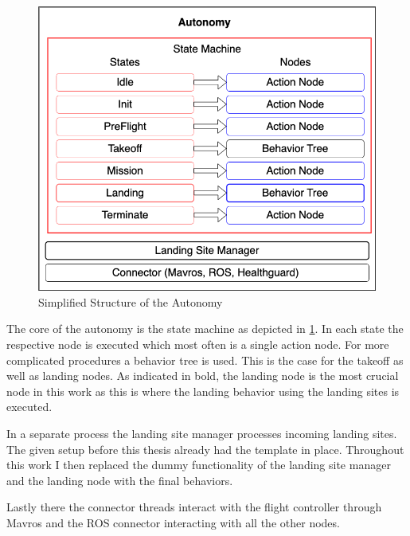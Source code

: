 \begin{figure}[ht!]
    \centering
    \includegraphics[scale=0.45]{images/setup/autonomy.png}
    \caption{Simplified Structure of the Autonomy}
    \label{fig:autonomy}
\end{figure}

The core of the autonomy is the state machine as depicted in \cref{fig:autonomy}. In each state the respective node is executed which most often is a single action node. For more complicated procedures a behavior tree is used. This is the case for the takeoff as well as landing nodes. As indicated in bold, the landing node is the most crucial node in this work as this is where the landing behavior using the landing sites is executed.

In a separate process the landing site manager processes incoming landing sites. The given setup before this thesis already had the template in place. Throughout this work I then replaced the dummy functionality of the landing site manager and the landing node with the final behaviors.

Lastly there the connector threads interact with the flight controller through Mavros and the ROS connector interacting with all the other nodes.








